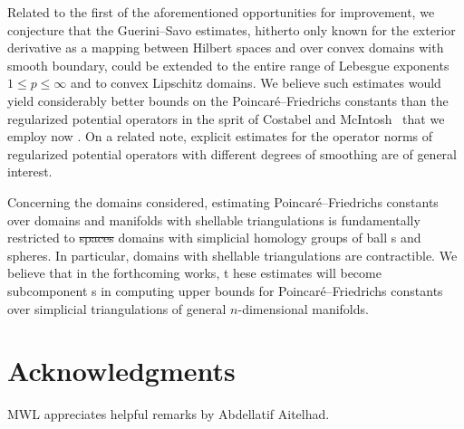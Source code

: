 \documentclass[10pt,letterpaper]{article}
\newcommand\cye[1]{%
  \protect\leavevmode
  \begingroup
    \color{red!35!yellow}%
    #1%
  \endgroup
}
\newcommand{\disk}{\cye{ball}}
\begin{document}
Related to the first of the aforementioned opportunities for improvement, we conjecture that the Guerini--Savo estimates, hitherto only known for the exterior derivative as a mapping between Hilbert spaces and over convex domains with smooth boundary, could be extended to the entire range of Lebesgue exponents $1 \leq p \leq \infty$ and to convex Lipschitz domains. We believe such estimates would yield considerably better bounds on the Poincar\'e--Friedrichs constants than the regularized potential operators \cye{in the sprit of Costabel and McIntosh~\cite{costabel2010bogovskiui} that we employ now}. 
On a related note, explicit estimates for the operator norms of regularized potential operators with different degrees of smoothing are of general interest. 

\cye{Concerning the domains considered,} estimating Poincar\'e--Friedrichs constants over domains and manifolds with shellable triangulations is fundamentally restricted to \cye{\sout{spaces} domains}  with simplicial homology groups of \disk s and spheres. In particular, domains with shellable triangulations are contractible. \cye{We believe that in the forthcoming works, t}hese estimates will \cye{become} subcomponent\cye{s} in computing upper bounds for Poincar\'e--Friedrichs constants over simplicial triangulations of general $n$-dimensional manifolds. 


\section*{Acknowledgments}

MWL appreciates helpful remarks by Abdellatif Aitelhad.

%


\end{document}
